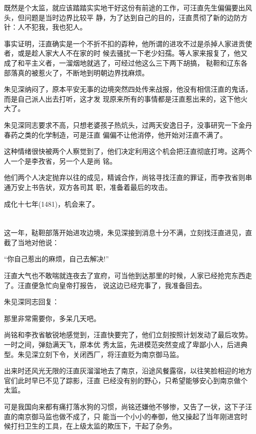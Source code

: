 \documentclass[11pt,a4paper,onecolumn]{article}
\begin{document}
既然是个太监，就应该踏踏实实地干好这份有前途的工作，可汪直先生偏偏要出风头，但问题是当时边界比较平
静，为了达到自己的目的，汪直贯彻了新的边防方针：人不犯我，我也犯人。

事实证明，汪直确实是一个不折不扣的孬种，他所谓的进攻不过是杀掉人家进贡使者，或是趁人家大人不在家的时
候去骚扰一下老少妇孺。等人家来报复了，他又成了和平主义者，一溜烟地就逃了，可经过他这么三下两下胡搞，
鞑靼和辽东各部落真的被惹火了，不断地到明朝边界找麻烦。

朱见深纳闷了，原本平安无事的边境突然四处传来战报，他没有相信汪直的鬼话，而是自己派人出去打听，这才发
现原来所有的事情都是汪直惹出来的，这下他火大了。

朱见深同志要求不高，只想老婆孩子热炕头，过两天安逸日子，没事研究一下金丹春药之类的化学制造，可是汪直
偏偏不让他消停，他开始对汪直不满了。

这种情绪很快被两个人察觉到了，他们决定利用这个机会把汪直彻底打垮。这两个人一个是李孜省，另一个人是尚
铭。

他们两个人决定抛弃以往的成见，精诚合作，尚铭寻找汪直的罪证，而李孜省则串通万安上书告状，双方各司其
职，准备着最后的攻击。

成化十七年(1481)，机会来了。

\section[\thesection]{}

这一年，鞑靼部落开始进攻边境，朱见深接到消息十分不满，立刻找汪直进见，直截了当地对他说：

``你自己惹出的麻烦，自己去解决!''

汪直大气也不敢喘就连夜去了宣府，可当他到达那里的时候，人家已经抢完东西走了。汪直便急忙向皇帝打报告，
说这边已经完事了，我准备回去。

朱见深同志回复：

那里非常需要你，多呆几天吧。

尚铭和李孜省敏锐地感觉到，汪直快要完了，他们立刻按照计划发动了最后攻势。一时之间，弹劾满天飞，原本优
秀太监，先进模范突然变成了卑鄙小人，后进典型。朱见深立刻下令，关闭西厂，将汪直贬为南京御马监。

出来时还风光无限的汪直灰溜溜地去了南京，沿途风餐露宿，以往笑脸相迎的地方官们此时早已不见了踪影，汪直
已经没有别的野心，只希望能够安心到南京做个太监。

可是我国向来都有痛打落水狗的习惯，尚铭还嫌他不够惨，又告了一状，这下子汪直的南京御马监也做不成了，只
能当一个小小的奉御，他又操起了当年刚进宫时候打扫卫生的工具，在上级太监的欺压下，干起了杂务。
\end{document}
